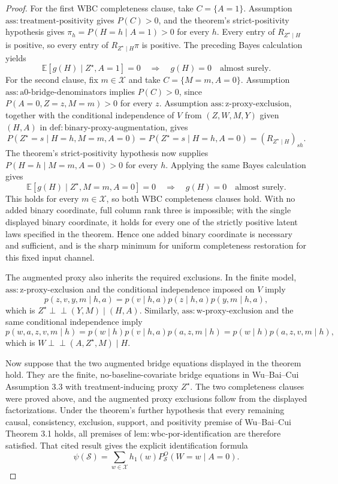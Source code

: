 \documentclass{article}
\begin{document}
\begin{proof}
For the first WBC completeness clause, take \(C=\{A=1\}\). Assumption \(\mathrm{ass{:}treatment\text{-}positivity}\) gives \(P(C)>0\), and the theorem's strict-positivity hypothesis gives \(\pi_h=P(H=h\mid A=1)>0\) for every \(h\). Every entry of \(R_{Z^{\star}\mid H}\) is positive, so every entry of \(R_{Z^{\star}\mid H}\pi\) is positive. The preceding Bayes calculation yields
\[
 \mathbb E[g(H)\mid Z^{\star},A=1]=0
 \quad\Longrightarrow\quad
 g(H)=0\quad\text{almost surely}.
\]
For the second clause, fix \(m\in\mathcal X\) and take \(C=\{M=m,A=0\}\). Assumption \(\mathrm{ass{:}a0\text{-}bridge\text{-}denominators}\) implies \(P(C)>0\), since \(P(A=0,Z=z,M=m)>0\) for every \(z\). Assumption \(\mathrm{ass{:}z\text{-}proxy\text{-}exclusion}\), together with the conditional independence of \(V\) from \((Z,W,M,Y)\) given \((H,A)\) in \(\mathrm{def{:}binary\text{-}proxy\text{-}augmentation}\), gives
\[
 P(Z^{\star}=s\mid H=h,M=m,A=0)
 =P(Z^{\star}=s\mid H=h,A=0)
 =(R_{Z^{\star}\mid H})_{sh}.
\]
The theorem's strict-positivity hypothesis now supplies \(P(H=h\mid M=m,A=0)>0\) for every \(h\). Applying the same Bayes calculation gives
\[
 \mathbb E[g(H)\mid Z^{\star},M=m,A=0]=0
 \quad\Longrightarrow\quad
 g(H)=0\quad\text{almost surely}.
\]
This holds for every \(m\in\mathcal X\), so both WBC completeness clauses hold. With no added binary coordinate, full column rank three is impossible; with the single displayed binary coordinate, it holds for every one of the strictly positive latent laws specified in the theorem. Hence one added binary coordinate is necessary and sufficient, and is the sharp minimum for uniform completeness restoration for this fixed input channel.

The augmented proxy also inherits the required exclusions. In the finite model, \(\mathrm{ass{:}z\text{-}proxy\text{-}exclusion}\) and the conditional independence imposed on \(V\) imply
\[
 p(z,v,y,m\mid h,a)
 =p(v\mid h,a)p(z\mid h,a)p(y,m\mid h,a),
\]
which is \(Z^{\star}\mathbin{\perp\!\!\!\perp}(Y,M)\mid(H,A)\). Similarly, \(\mathrm{ass{:}w\text{-}proxy\text{-}exclusion}\) and the same conditional independence imply
\[
 p(w,a,z,v,m\mid h)
 =p(w\mid h)p(v\mid h,a)p(a,z,m\mid h)
 =p(w\mid h)p(a,z,v,m\mid h),
\]
which is \(W\mathbin{\perp\!\!\!\perp}(A,Z^{\star},M)\mid H\).

Now suppose that the two augmented bridge equations displayed in the theorem hold. They are the finite, no-baseline-covariate bridge equations in Wu--Bai--Cui Assumption 3.3 with treatment-inducing proxy \(Z^{\star}\). The two completeness clauses were proved above, and the augmented proxy exclusions follow from the displayed factorizations. Under the theorem's further hypothesis that every remaining causal, consistency, exclusion, support, and positivity premise of Wu--Bai--Cui Theorem 3.1 holds, all premises of \(\mathrm{lem{:}wbc\text{-}por\text{-}identification}\) are therefore satisfied. That cited result gives the explicit identification formula
\[
 \psi(\mathcal S)
 =\sum_{w\in\mathcal X}h_1(w)P_{\mathcal S}^O(W=w\mid A=0).
\]


\end{proof}
\end{document}
